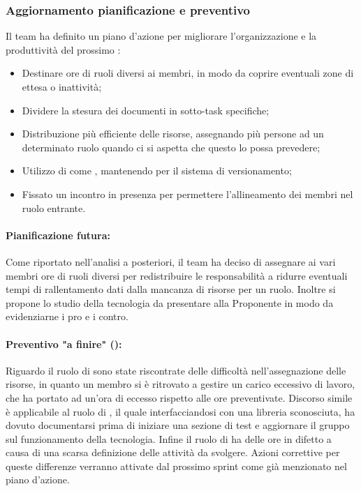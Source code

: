 \subsubsection{Aggiornamento pianificazione e preventivo}
\par Il team ha definito un piano d'azione per migliorare l'organizzazione e la produttività del prossimo :
\begin{itemize}
  \item Destinare ore di ruoli diversi ai membri, in modo da coprire eventuali zone di ettesa o inattività;
  \item Dividere la stesura dei documenti in sotto-task specifiche;
  \item Distribuzione più efficiente delle risorse, assegnando più persone ad un determinato ruolo quando ci si aspetta che questo lo possa prevedere;
  \item Utilizzo di  come , mantenendo  per il sistema di versionamento;
  \item Fissato un incontro in presenza per permettere l'allineamento dei membri nel ruolo entrante.
\end{itemize}

\paragraph*{Pianificazione futura:}
\par Come riportato nell'analisi a posteriori, il team ha deciso di assegnare ai vari membri ore di ruoli diversi per redistribuire le responsabilità a ridurre eventuali tempi di rallentamento dati dalla mancanza di risorse per un ruolo. Inoltre si propone lo studio della tecnologia  da presentare alla Proponente in modo da evidenziarne i pro e i contro.

\paragraph*{Preventivo "a finire" ():}
\par Riguardo il ruolo di \Amministratore{} sono state riscontrate delle difficoltà nell'assegnazione delle risorse, in quanto un membro si è ritrovato a gestire un carico eccessivo di lavoro, che ha portato ad un'ora di eccesso rispetto alle ore preventivate. Discorso simile è applicabile al ruolo di \Programmatore{}, il quale interfacciandosi con una libreria sconosciuta, ha dovuto documentarsi prima di iniziare una sezione di test e aggiornare il gruppo sul funzionamento della tecnologia. Infine il ruolo di \Progettista{} ha delle ore in difetto a causa di una scarsa definizione delle attività da svolgere. Azioni correttive per queste differenze verranno attivate dal prossimo sprint come già menzionato nel piano d'azione.

